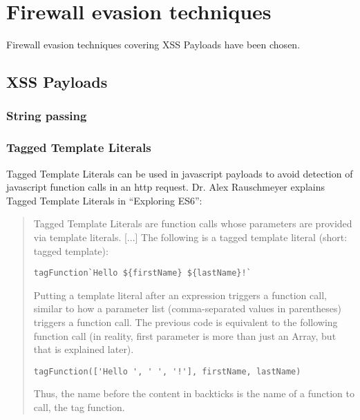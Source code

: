 \section{Firewall evasion techniques}
\label{sec:Firewall evasion techniques}

Firewall evasion techniques covering XSS Payloads have been chosen.



\subsection{XSS Payloads}

\subsubsection{String passing}

\subsubsection{Tagged Template Literals}
Tagged Template Literals can be used in javascript payloads to avoid detection of javascript function calls in an http request. Dr. Alex Rauschmeyer explains Tagged Template Literals in ``Exploring ES6'':
\begin{quotation} Tagged Template Literals are function calls whose parameters are provided via template literals. [...]
	The following is a tagged template literal (short: tagged template):
	\begin{lstlisting}
tagFunction`Hello ${firstName} ${lastName}!`
\end{lstlisting}
	Putting a template literal after an expression triggers a function call, similar to how a parameter list (comma-separated values in parentheses) triggers a function call. The previous code is equivalent to the following function call (in reality, first parameter is more than just an Array, but that is explained later).
	\begin{lstlisting}
tagFunction(['Hello ', ' ', '!'], firstName, lastName)
\end{lstlisting}
	Thus, the name before the content in backticks is the name of a function to call, the tag function.
	\cite{exploringes6/templatelit}
\end{quotation}

